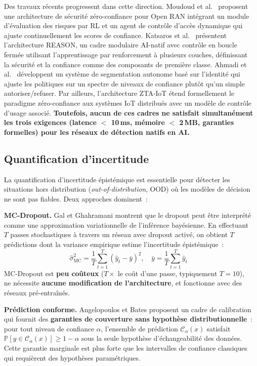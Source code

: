 Des travaux récents progressent dans cette direction. Moudoud et al.\ \cite{moudoud2025oran_zt} proposent une architecture de sécurité zéro-confiance pour Open RAN intégrant un module d'évaluation des risques par RL et un agent de contrôle d'accès dynamique qui ajuste continuellement les scores de confiance. Katsaros et al.\ \cite{katsaros2024reason} présentent l'architecture REASON, un cadre modulaire AI-natif avec contrôle en boucle fermée utilisant l'apprentissage par renforcement à plusieurs couches, définissant la sécurité et la confiance comme des composants de première classe. Ahmadi et al.\ \cite{ahmadi2025zt_segmentation} développent un système de segmentation autonome basé sur l'identité qui ajuste les politiques sur un spectre de niveaux de confiance plutôt qu'un simple autoriser/refuser. Par ailleurs, l'architecture ZTA-IoT \cite{ztaiot_acm2025} étend formellement le paradigme zéro-confiance aux systèmes IoT distribués avec un modèle de contrôle d'usage associé. \textbf{Toutefois, aucun de ces cadres ne satisfait simultanément les trois exigences (latence $<$ 10\,ms, mémoire $<$ 2\,MB, garanties formelles) pour les réseaux de détection natifs en AI.}

\subsection{Quantification d'incertitude}

La quantification d'incertitude épistémique est essentielle pour détecter les situations hors distribution (\emph{out-of-distribution}, OOD) où les modèles de décision ne sont pas fiables. Deux approches dominent~:

\textbf{MC-Dropout.} Gal et Ghahramani \cite{gal2016dropout} montrent que le dropout peut être interprété comme une approximation variationnelle de l'inférence bayésienne. En effectuant $T$ passes stochastiques à travers un réseau avec dropout activé, on obtient $T$ prédictions dont la variance empirique estime l'incertitude épistémique~:
\begin{equation}
    \hat{\sigma}^2_{\text{MC}} = \frac{1}{T} \sum_{t=1}^{T} \left(\hat{y}_t - \bar{y}\right)^2, \quad \bar{y} = \frac{1}{T}\sum_{t=1}^T \hat{y}_t
\end{equation}
MC-Dropout est \textbf{peu coûteux} ($T \times$ le coût d'une passe, typiquement $T = 10$), ne nécessite \textbf{aucune modification de l'architecture}, et fonctionne avec des réseaux pré-entraînés.

\textbf{Prédiction conforme.} Angelopoulos et Bates \cite{angelopoulos2023conformal} proposent un cadre de calibration qui fournit des \textbf{garanties de couverture sans hypothèse distributionnelle}~: pour tout niveau de confiance $\alpha$, l'ensemble de prédiction $\mathcal{C}_\alpha(x)$ satisfait $\mathbb{P}[y \in \mathcal{C}_\alpha(x)] \geq 1 - \alpha$ sous la seule hypothèse d'échangeabilité des données. Cette garantie marginale est plus forte que les intervalles de confiance classiques qui requièrent des hypothèses paramétriques.

